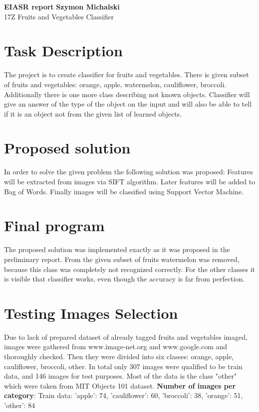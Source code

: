 \documentclass[a4paper, 11pt]{article}
\begin{document}
\noindent
\large\textbf{EIASR report} \hfill \textbf{Szymon Michalski} \\
\normalsize 17Z \hfill Fruits and Vegetables Classifier\\


\section*{Task Description}
The project is to create classifier for fruits and vegetables. 
There is given subset of fruits and vegetables: orange, apple, watermelon, cauliflower, broccoli. Additionally there is one more class describing not known objects.
Classifier will give an answer of the type of the object on the input and will also be able to tell if it is an object not from the given list of learned objects.

\section*{Proposed solution}
In order to solve the given problem the following solution was proposed:
Features will be extracted from images via SIFT algorithm. Later features will be added to Bag of Words. Finally images will be classified using Support Vector Machine.

\section*{Final program}
The proposed solution was implemented exactly as it was proposed in the preliminary report. From the given subset of fruits watermelon was removed, because this class was completely not recognized correctly. For the other classes it is visible that classifier works, even though the accuracy is far from perfection.

\section*{Testing Images Selection}
Due to lack of prepared dataset of already tagged fruits and vegetables imaged, images were gathered from www.image-net.org and www.google.com and thoroughly checked. Then they were divided into six classes: orange, apple, cauliflower, broccoli, other. In total only 307 images were qualified to be train data, and 146 images for test purposes. Most of the data is the class "other" which were taken from MIT Objects 101 dataset.
\textbf{Number of images per category}:
Train data:
'apple': 74, 'cauliflower': 60, 'broccoli': 38, 'orange': 51, 'other': 84
\end{document}
